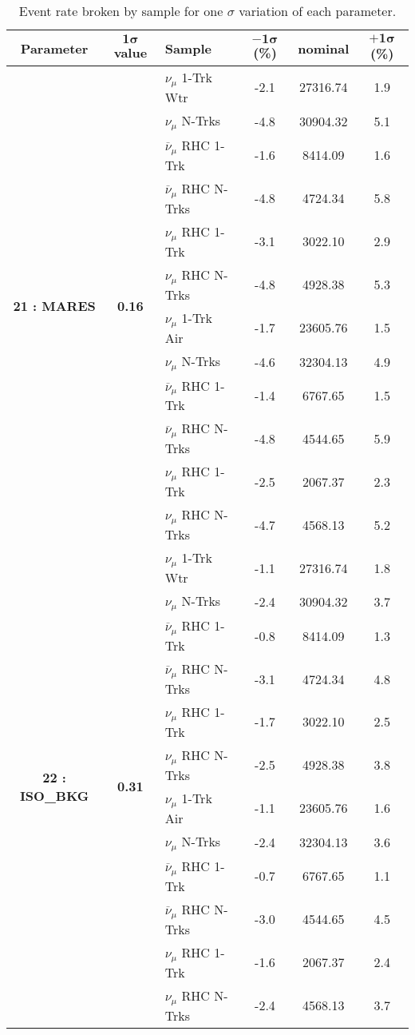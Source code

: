 \addtocounter{table}{-1}
\begin{table}[ht!]
\centering
\begin{tabular}{ c  c  l  c  c  c }
\midrule[1.3pt]
\textbf{Parameter} & \textbf{$\mathbf{1\sigma}$ value} & \textbf{Sample} & \textbf{$\mathbf{-1\sigma}$ (\%)}  &  \textbf{nominal}  &  \textbf{$\mathbf{+1\sigma}$ (\%)} \\
\midrule[1.3pt]
\multirow{12}{*}{\textbf{21 : MARES}} & \multirow{12}{*}{\textbf{0.16}} & $\nu_\mu$ 1-Trk Wtr &   -2.1 &  27316.74 &   1.9 \\ 
 &  & $\nu_\mu$ N-Trks &   -4.8 &  30904.32 &   5.1 \\ 
 &  & $\overline{\nu}_\mu$ RHC 1-Trk &   -1.6 &  8414.09 &   1.6 \\ 
 &  & $\overline{\nu}_\mu$ RHC N-Trks &   -4.8 &  4724.34 &   5.8 \\ 
 &  & $\nu_\mu$ RHC 1-Trk &   -3.1 &  3022.10 &   2.9 \\ 
 &  & $\nu_\mu$ RHC N-Trks &   -4.8 &  4928.38 &   5.3 \\ 
 &  & $\nu_\mu$ 1-Trk Air &   -1.7 &  23605.76 &   1.5 \\ 
 &  & $\nu_\mu$ N-Trks &   -4.6 &  32304.13 &   4.9 \\ 
 &  & $\overline{\nu}_\mu$ RHC 1-Trk &   -1.4 &  6767.65 &   1.5 \\ 
 &  & $\overline{\nu}_\mu$ RHC N-Trks &   -4.8 &  4544.65 &   5.9 \\ 
 &  & $\nu_\mu$ RHC 1-Trk &   -2.5 &  2067.37 &   2.3 \\ 
 &  & $\nu_\mu$ RHC N-Trks &   -4.7 &  4568.13 &   5.2 \\ 
\midrule[1.3pt]
\multirow{12}{*}{\textbf{22 : ISO\_BKG}} & \multirow{12}{*}{\textbf{0.31}} & $\nu_\mu$ 1-Trk Wtr &   -1.1 &  27316.74 &   1.8 \\ 
 &  & $\nu_\mu$ N-Trks &   -2.4 &  30904.32 &   3.7 \\ 
 &  & $\overline{\nu}_\mu$ RHC 1-Trk &   -0.8 &  8414.09 &   1.3 \\ 
 &  & $\overline{\nu}_\mu$ RHC N-Trks &   -3.1 &  4724.34 &   4.8 \\ 
 &  & $\nu_\mu$ RHC 1-Trk &   -1.7 &  3022.10 &   2.5 \\ 
 &  & $\nu_\mu$ RHC N-Trks &   -2.5 &  4928.38 &   3.8 \\ 
 &  & $\nu_\mu$ 1-Trk Air &   -1.1 &  23605.76 &   1.6 \\ 
 &  & $\nu_\mu$ N-Trks &   -2.4 &  32304.13 &   3.6 \\ 
 &  & $\overline{\nu}_\mu$ RHC 1-Trk &   -0.7 &  6767.65 &   1.1 \\ 
 &  & $\overline{\nu}_\mu$ RHC N-Trks &   -3.0 &  4544.65 &   4.5 \\ 
 &  & $\nu_\mu$ RHC 1-Trk &   -1.6 &  2067.37 &   2.4 \\ 
 &  & $\nu_\mu$ RHC N-Trks &   -2.4 &  4568.13 &   3.7 \\ 
\midrule[1.3pt]
\end{tabular}
\centering
\caption{Event rate broken by sample for one $\sigma$ variation of each parameter.}
\end{table}
